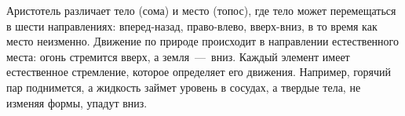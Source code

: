 


Аристотель различает тело (сома) и место (топос), где тело может перемещаться в шести направлениях: вперед-назад, право-влево, вверх-вниз, в то время как место неизменно. Движение по природе происходит в направлении естественного места: огонь стремится вверх, а земля~---~вниз. Каждый элемент имеет естественное стремление, которое определяет его движения. Например, горячий пар поднимется, а жидкость займет уровень в сосудах, а твердые тела, не изменяя формы, упадут вниз.


